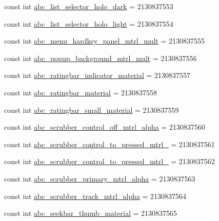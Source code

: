 \begin{CompactItemize}
\item 
const int \hyperlink{class__2doo_1_1_droid_1_1_resource_1_1_drawable_6590566b028dca35285b3b9a1d499299}{abc\_\-list\_\-selector\_\-holo\_\-dark} = 2130837553
\item 
const int \hyperlink{class__2doo_1_1_droid_1_1_resource_1_1_drawable_3f6474dd751d7e3ffdb01e609d151390}{abc\_\-list\_\-selector\_\-holo\_\-light} = 2130837554
\item 
const int \hyperlink{class__2doo_1_1_droid_1_1_resource_1_1_drawable_a90cfa2a89b6ec77bc6f585101c43c81}{abc\_\-menu\_\-hardkey\_\-panel\_\-mtrl\_\-mult} = 2130837555
\item 
const int \hyperlink{class__2doo_1_1_droid_1_1_resource_1_1_drawable_310ec4e1e6f292d47a56db96000c0d84}{abc\_\-popup\_\-background\_\-mtrl\_\-mult} = 2130837556
\item 
const int \hyperlink{class__2doo_1_1_droid_1_1_resource_1_1_drawable_a06ca855cda9f483bcbed646244c15e7}{abc\_\-ratingbar\_\-indicator\_\-material} = 2130837557
\item 
const int \hyperlink{class__2doo_1_1_droid_1_1_resource_1_1_drawable_4120e62f077142bab8d6660f54ffec56}{abc\_\-ratingbar\_\-material} = 2130837558
\item 
const int \hyperlink{class__2doo_1_1_droid_1_1_resource_1_1_drawable_e6eaaafa3ef72a21fea65f415346ff1a}{abc\_\-ratingbar\_\-small\_\-material} = 2130837559
\item 
const int \hyperlink{class__2doo_1_1_droid_1_1_resource_1_1_drawable_93806d16aff6cf4a41f24b21a1d25daa}{abc\_\-scrubber\_\-control\_\-off\_\-mtrl\_\-alpha} = 2130837560
\item 
const int \hyperlink{class__2doo_1_1_droid_1_1_resource_1_1_drawable_1ded0f5c6b41692747d112336b6205a5}{abc\_\-scrubber\_\-control\_\-to\_\-pressed\_\-mtrl\_} = 2130837561
\item 
const int \hyperlink{class__2doo_1_1_droid_1_1_resource_1_1_drawable_9c692d9ef6a6df01999a4a04e3d825ba}{abc\_\-scrubber\_\-control\_\-to\_\-pressed\_\-mtrl\_} = 2130837562
\item 
const int \hyperlink{class__2doo_1_1_droid_1_1_resource_1_1_drawable_3f8014d23d3922c31dd55191231c04c1}{abc\_\-scrubber\_\-primary\_\-mtrl\_\-alpha} = 2130837563
\item 
const int \hyperlink{class__2doo_1_1_droid_1_1_resource_1_1_drawable_a4f0b0223bf7fcb9a006aca06d558fb9}{abc\_\-scrubber\_\-track\_\-mtrl\_\-alpha} = 2130837564
\item 
const int \hyperlink{class__2doo_1_1_droid_1_1_resource_1_1_drawable_52ab428c3f78eacdbaf1c0510039783e}{abc\_\-seekbar\_\-thumb\_\-material} = 2130837565

\end{CompactItemize}
